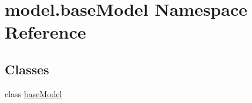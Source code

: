 \hypertarget{namespacemodel_1_1baseModel}{}\section{model.\+base\+Model Namespace Reference}
\label{namespacemodel_1_1baseModel}
\subsection*{Classes}
\begin{DoxyCompactItemize}
\item 
class \hyperlink{classmodel_1_1baseModel_1_1baseModel}{base\+Model}
\end{DoxyCompactItemize}
